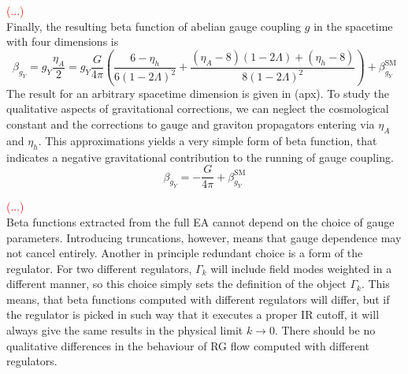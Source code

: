 \documentclass[11pt, a4paper]{article}
\begin{document}
\textcolor{red}{(...)}\\

Finally, the resulting beta function of abelian gauge coupling $g$ in the spacetime with four dimensions is
\begin{equation}
    \beta_{g_Y} = g_Y \frac{\eta_A}{2} = g_Y \frac{G}{4 \pi} \left( \frac{6 - \eta_h}{6(1-2 \Lambda)^2} + 
    \frac{(\eta_A-8)(1-2\Lambda) + (\eta_h -8)}{8 (1-2 \Lambda )^2}\right) + \beta_{g_Y}^{\text{SM}}
\end{equation}
The result for an arbitrary spacetime dimension is given in (apx).
To study the qualitative aspects of gravitational corrections, we can neglect the cosmological constant and
the corrections to gauge and graviton propagators entering via $\eta_A$ and $\eta_h$. This approximations
yields a very simple form of beta function, that indicates a negative gravitational contribution to the running
of gauge coupling.
\begin{equation}
    \beta_{g_Y} = - \frac{G}{4 \pi} + \beta_{g_Y}^{\text{SM}}
\end{equation}

\textcolor{red}{(...)}\\

Beta functions extracted from the full EA cannot depend on the choice of gauge parameters.
Introducing truncations, however, means that gauge dependence may not cancel entirely.
Another in principle redundant choice is a form of the regulator. For two different regulators,
$\Gamma_k$ will include field modes weighted in a different manner, so this choice simply
sets the definition of the object $\Gamma_k$. 
This means, that beta functions computed with different regulators will differ, but
if the regulator is picked in such way that it executes a proper IR cutoff,
it will always give the same results in the physical limit $k \rightarrow 0$. There should be no
qualitative differences in the behaviour of RG flow computed with different regulators.


\end{document}
